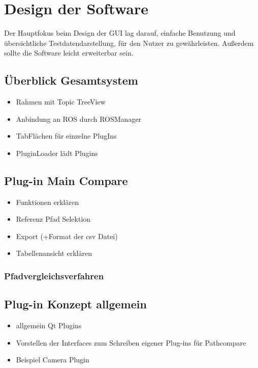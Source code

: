 \section{Design der Software}
Der Hauptfokus beim Design der GUI lag darauf, einfache Benutzung und
übersichtliche Testdatendarstellung, für den Nutzer zu gewährleisten.
Außerdem sollte die Software leicht erweiterbar sein.

\subsection{Überblick Gesamtsystem}
\begin{itemize}
  \item Rahmen mit Topic TreeView
  \item Anbindung an ROS durch ROSManager
  \item TabFlächen für einzelne PlugIns
  \item PluginLoader lädt Plugins
\end{itemize}

\subsection{Plug-in Main Compare}
\begin{itemize}
  \item Funktionen erklären
  \item Referenz Pfad Selektion
  \item Export (+Format der csv Datei)
  \item Tabellenansicht erklären
\end{itemize}

\subsubsection{Pfadvergleichsverfahren}



\subsection{Plug-in Konzept allgemein}
\begin{itemize}
  \item allgemein Qt Plugins
  \item Vorstellen der Interfaces zum Schreiben eigener Plug-ins für Pathcompare
  \item Beispiel Camera Plugin
\end{itemize}
